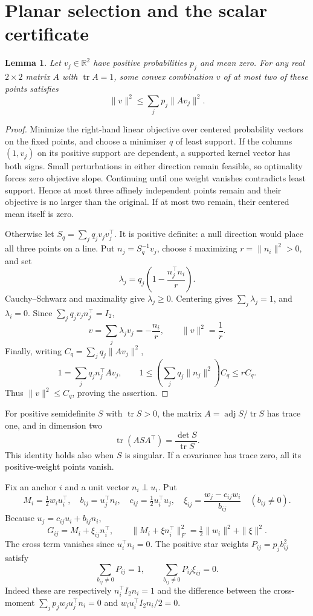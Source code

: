 \documentclass[10pt]{article}
\newtheorem{lemma}[theorem]{Lemma}
\newcommand{\R}{\mathbb R}
\newcommand{\tr}{\operatorname{tr}}
\newcommand{\adj}{\operatorname{adj}}
\begin{document}
\section{Planar selection and the scalar certificate}
\begin{lemma}\label{planar}
Let $v_j\in\R^2$ have positive probabilities $p_j$ and mean zero. For any
real $2\times2$ matrix $A$ with $\tr A=1$, some convex combination $v$ of
at most two of these points satisfies
\[
 \|v\|^2\le\sum_jp_j\|Av_j\|^2.
\]
\end{lemma}
\begin{proof}
Minimize the right-hand linear objective over centered probability vectors
on the fixed points, and choose a minimizer $q$ of least support. If the
columns $(1,v_j)$ on its positive support are dependent, a supported kernel
vector has both signs. Small perturbations in either direction remain
feasible, so optimality forces zero objective slope. Continuing until one
weight vanishes contradicts least support. Hence at most three affinely
independent points remain and their objective is no larger than the original.
If at most two remain, their centered mean itself is zero.

Otherwise let $S_q=\sum_jq_jv_jv_j^\top$. It is positive definite: a null
direction would place all three points on a line. Put $n_j=S_q^{-1}v_j$,
choose $i$ maximizing $r=\|n_i\|^2>0$, and set
\[
 \lambda_j=q_j\left(1-\frac{n_j^\top n_i}{r}\right).
\]
Cauchy--Schwarz and maximality give $\lambda_j\ge0$. Centering gives
$\sum_j\lambda_j=1$, and $\lambda_i=0$. Since
$\sum_jq_jv_jn_j^\top=I_2$,
\[
 v=\sum_j\lambda_jv_j=-\frac{n_i}{r},\qquad \|v\|^2=\frac1r.
\]
Finally, writing $C_q=\sum_jq_j\|Av_j\|^2$,
\[
 1=\sum_jq_j n_j^\top Av_j,\qquad
 1\le\left(\sum_jq_j\|n_j\|^2\right)C_q\le rC_q.
\]
Thus $\|v\|^2\le C_q$, proving the assertion.
\end{proof}

For positive semidefinite $S$ with $\tr S>0$, the matrix
$A=\adj S/\tr S$ has trace one, and in dimension two
\begin{equation}\label{adjidentity}
 \tr(ASA^\top)=\frac{\det S}{\tr S}.
\end{equation}
This identity holds also when $S$ is singular. If a covariance has trace
zero, all its positive-weight points vanish.

Fix an anchor $i$ and a unit vector $n_i\perp u_i$. Put
\[
 M_i=\tfrac12w_iu_i^\top,\quad
 b_{ij}=u_j^\top n_i,\quad c_{ij}=\tfrac12u_i^\top u_j,
 \quad \xi_{ij}=\frac{w_j-c_{ij}w_i}{b_{ij}}\quad(b_{ij}\ne0).
\]
Because $u_j=c_{ij}u_i+b_{ij}n_i$,
\[
 G_{ij}=M_i+\xi_{ij}n_i^\top,\qquad
 \|M_i+\xi n_i^\top\|_F^2=\tfrac12\|w_i\|^2+\|\xi\|^2.
\]
The cross term vanishes since $u_i^\top n_i=0$. The positive star weights
$P_{ij}=p_jb_{ij}^2$ satisfy
\[
 \sum_{b_{ij}\ne0}P_{ij}=1,\qquad
 \sum_{b_{ij}\ne0}P_{ij}\xi_{ij}=0.
\]
Indeed these are respectively $n_i^\top I_2n_i=1$ and the difference
between the cross-moment $\sum_jp_jw_ju_j^\top n_i=0$ and
$w_i u_i^\top I_2n_i/2=0$.
\end{document}
